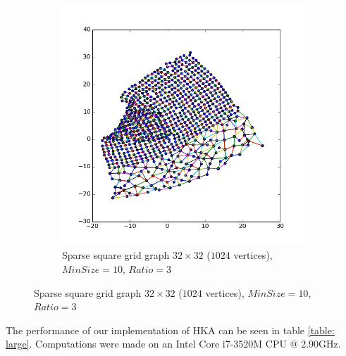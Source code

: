 \documentclass[12pt,a4paper]{article}
\begin{document}
\begin{figure}[htb]
\begin{subfigure}{0.5\textwidth}
           \includegraphics[scale=0.45]{results_Harel/HK_sgrid32x32_m10_r3.png}
            \caption{Sparse square grid graph $32\times 32$ ($1024$ vertices), $MinSize=10$, $Ratio=3$}
     \end{subfigure}
     \label{fig: sgrid}
\end{figure}     

\newpage

The performance of our implementation of HKA can be seen in table \ref{table: large}. Computations were made on an Intel Core i7-3520M CPU @ 2.90GHz.
\end{document}
